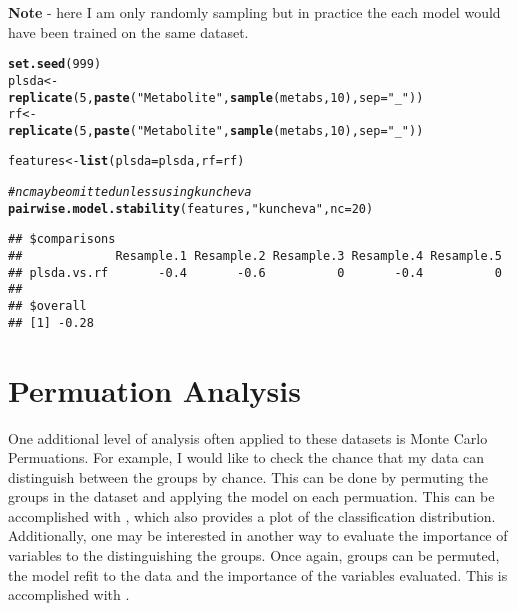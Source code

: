 \documentclass[12pt]{article}\usepackage[]{graphicx}\usepackage[usenames,dvipsnames]{color}
\makeatletter
\newcommand{\hlnum}[1]{\textcolor[rgb]{0.686,0.059,0.569}{#1}}%
\newcommand{\hlstr}[1]{\textcolor[rgb]{0.192,0.494,0.8}{#1}}%
\newcommand{\hlcom}[1]{\textcolor[rgb]{0.678,0.584,0.686}{\textit{#1}}}%
\newcommand{\hlstd}[1]{\textcolor[rgb]{0.345,0.345,0.345}{#1}}%
\newcommand{\hlkwb}[1]{\textcolor[rgb]{0.69,0.353,0.396}{#1}}%
\newcommand{\hlkwc}[1]{\textcolor[rgb]{0.333,0.667,0.333}{#1}}%
\newcommand{\hlkwd}[1]{\textcolor[rgb]{0.737,0.353,0.396}{\textbf{#1}}}%
\newenvironment{kframe}{%
 \def\at@end@of@kframe{}%
 \ifinner\ifhmode%
  \def\at@end@of@kframe{\end{minipage}}%
  \begin{minipage}{\columnwidth}%
 \fi\fi%
 \def\FrameCommand##1{\hskip\@totalleftmargin \hskip-\fboxsep
 \colorbox{shadecolor}{##1}\hskip-\fboxsep
     \hskip-\linewidth \hskip-\@totalleftmargin \hskip\columnwidth}%
 \MakeFramed {\advance\hsize-\width
   \@totalleftmargin\z@ \linewidth\hsize
   \@setminipage}}%
 {\par\unskip\endMakeFramed%
 \at@end@of@kframe}
\newenvironment{knitrout}{}{} %
\makeatother
\begin{document}
\textbf{Note} - here I am only randomly sampling but in practice the each model
would have been trained on the same dataset. 

\begin{knitrout}
\color{fgcolor}\begin{kframe}
\begin{alltt}
\hlkwd{set.seed}\hlstd{(}\hlnum{999}\hlstd{)}
\hlstd{plsda} \hlkwb{<-}
    \hlkwd{replicate}\hlstd{(}\hlnum{5}\hlstd{,} \hlkwd{paste}\hlstd{(}\hlstr{"Metabolite"}\hlstd{,} \hlkwd{sample}\hlstd{(metabs,} \hlnum{10}\hlstd{),} \hlkwc{sep}\hlstd{=}\hlstr{"_"}\hlstd{))}
\hlstd{rf} \hlkwb{<-}
    \hlkwd{replicate}\hlstd{(}\hlnum{5}\hlstd{,} \hlkwd{paste}\hlstd{(}\hlstr{"Metabolite"}\hlstd{,} \hlkwd{sample}\hlstd{(metabs,} \hlnum{10}\hlstd{),} \hlkwc{sep}\hlstd{=}\hlstr{"_"}\hlstd{))}

\hlstd{features} \hlkwb{<-} \hlkwd{list}\hlstd{(}\hlkwc{plsda}\hlstd{=plsda,} \hlkwc{rf}\hlstd{=rf)}

\hlcom{# nc may be omitted unless using kuncheva}
\hlkwd{pairwise.model.stability}\hlstd{(features,} \hlstr{"kuncheva"}\hlstd{,} \hlkwc{nc}\hlstd{=}\hlnum{20}\hlstd{)}
\end{alltt}
\begin{verbatim}
## $comparisons
##             Resample.1 Resample.2 Resample.3 Resample.4 Resample.5
## plsda.vs.rf       -0.4       -0.6          0       -0.4          0
## 
## $overall
## [1] -0.28
\end{verbatim}
\end{kframe}
\end{knitrout}

\newpage
\section{Permuation Analysis}

One additional level of analysis often applied to these datasets is Monte
Carlo Permuations.  For example, I would like to check the chance that
my data can distinguish between the groups by chance.  This can be done by
permuting the groups in the dataset and applying the model on each permuation.
This can be accomplished with , which also provides a 
plot of the classification distribution.  Additionally, one may
be interested in another way to evaluate the importance of variables to the 
distinguishing the groups.  Once again, groups can be permuted, the model
refit to the data and the importance of the variables evaluated.  This is
accomplished with .
\end{document}
